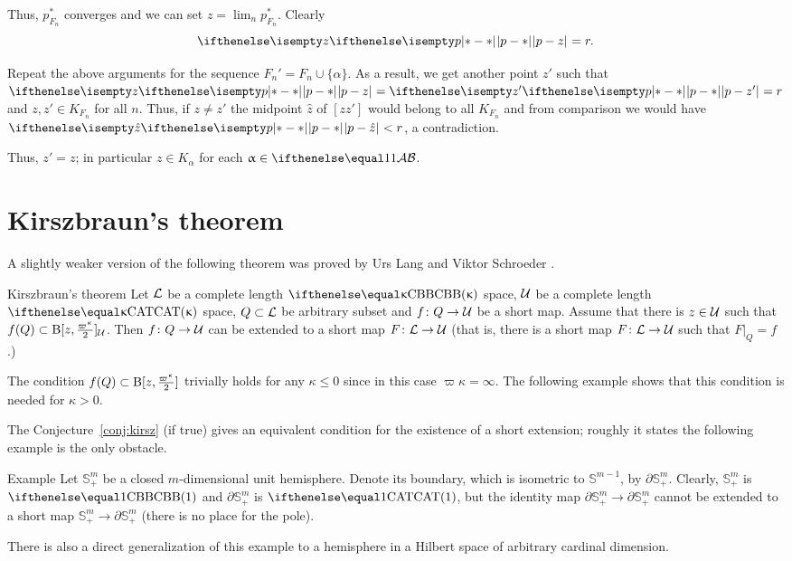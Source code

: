 Thus, $p^*_{F_n}$ converges and we can set $z=\lim_n p^*_{F_n}$.
Clearly 
\[\dist{p}{z}{}=r.\]

Repeat the above arguments for  the sequence $F_n'=F_n\cup \{\alpha\}$.
As a result, we get another point $z'$ such that $\dist{p}{z}{}=\dist{p}{z'}{}=r$ and 
$z,z'\in K_{F_n}$ for all $n$.
Thus, if $z\not=z'$ the midpoint $\hat z$ of $[zz']$ would belong to all 
$K_{F_n}$ and from comparison we would have $\dist{p}{\hat z}{}<r$, a contradiction.

Thus, $z'=z$; in particular 
$z\in K_\alpha$ for each $\alpha\in\IndexSet$.
\qeds



\section{Kirszbraun's theorem}\label{sec:kirszbraun}

A slightly weaker version of the following theorem was proved by Urs Lang and Viktor Schroeder \cite{lang-schroeder}.

\begin{thm}{Kirszbraun's theorem}
\label{thm:kirsz+}
Let
$\mathcal{L}$ be a complete length $\Alex{\kappa}$ space, 
$\mathcal{U}$ be a complete length $\CAT\kappa$ space, 
$Q\subset \spc{L}$ be arbitrary subset
and $f\: Q\to\spc{U}$ be a short map.
Assume that there is $z\in\spc{U}$ such that 
$f(Q)\subset \oBall[z,\tfrac{\varpi\kappa}{2}]_{\spc{U}}$.
Then $f\:Q\to\spc{U}$ can be extended to a short map 
$F\:\spc{L}\to \spc{U}$
(that is, there is a short map $F\:\spc{L}\to \spc{U}$ such that $F|_Q=f$.)
\end{thm}
 
The condition $f(Q)\subset \oBall[z,\tfrac{\varpi\kappa}{2}]$ trivially holds for any $\kappa\le 0$ since in this case $\varpi\kappa=\infty$. 
The following example shows that this condition is needed for $\kappa>0$.

The Conjecture~\ref{conj:kirsz} (if true) gives an equivalent condition for the existence of a short extension;
roughly it states the following example is the only obstacle.

\begin{thm}{Example}\label{example:SS_+}
Let $\mathbb{S}^m_+$ be a closed $m$-dimensional unit hemisphere.  Denote its boundary, which is isometric to $\mathbb{S}^{m-1}$, by  $\partial\mathbb{S}^m_+$.
Clearly, $\mathbb{S}^m_+$ is $\Alex{1}$ and $\partial\mathbb{S}^m_+$ is $\CAT1$, but the identity map ${\partial\mathbb{S}^m_+}\to \partial\mathbb{S}^m_+$ cannot be extended to a short map $\mathbb{S}^m_+\to \partial\mathbb{S}^m_+$ (there is no place for the pole).

There is also a direct generalization of this example to a hemisphere in a Hilbert space of arbitrary cardinal dimension.
\end{thm}

